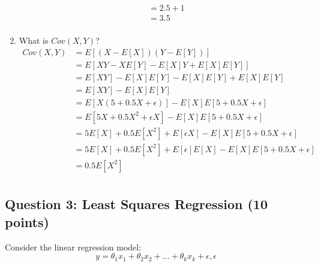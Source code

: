 \documentclass{article}
\begin{document}
\begin{enumerate}
\begin{align*}
&= 2.5 + 1\\
&= 3.5\\
\end{align*}
\item What is $Cov(X,Y)$?
\begin{align*}
Cov(X, Y) &= E[(X - E[X])(Y - E[Y])]\\
&= E[XY - XE[Y] - E[X]Y + E[X]E[Y]]\\
&= E[XY] - E[X]E[Y] - E[X]E[Y] + E[X]E[Y]\\
&= E[XY] - E[X]E[Y]\\
&= E[X(5 + 0.5X + \epsilon)] - E[X]E[5 + 0.5X + \epsilon]\\
&= E[5X + 0.5X ^ 2 + \epsilon X] - E[X]E[5 + 0.5X + \epsilon]\\
&= 5E[X] + 0.5E[X ^ 2] + E[\epsilon X] - E[X]E[5 + 0.5X + \epsilon]\\
&= 5E[X] + 0.5E[X ^ 2] + E[\epsilon]E[X] - E[X]E[5 + 0.5X + \epsilon]\\
&= 0.5E[X ^ 2]\\
\end{align*}
\end{enumerate}

\subsection*{Question 3: Least Squares Regression (10 points)}

Consider the linear regression model: 
\begin{equation}
    y = \theta_{1}x_{1} + \theta_{2}x_{2} + ... + \theta_{k}x_{k} + \epsilon, \epsilon
\end{equation}
\end{document}
